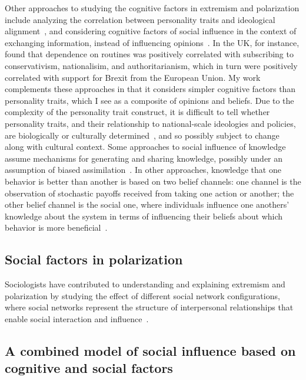 \documentclass[12pt,letterpaper]{article}
\begin{document}
Other approaches to studying the cognitive factors in extremism and polarization
include analyzing the correlation between personality traits and ideological
alignment~\cite{Rollwage2019}, and considering cognitive factors of social influence 
in the context of exchanging information, instead of influencing opinions~\cite{Carley1990,Carley1991,Bala1998}.
In the UK, for instance,  found that dependence on routines was
positively correlated with subscribing to conservativism, nationalisim, and
authoritarianism, which in turn were positively correlated with support for
Brexit from the European Union. My work complements these approaches in that
it considers simpler cognitive factors than personality traits, which I see
as a composite of opinions and beliefs. Due to the complexity of the
personality trait construct, it is difficult to tell whether personality traits,
and their relationship to national-scale ideologies and policies,
are biologically or culturally determined~\cite{Claidiere2012c,Smaldino2019d},
and so possibly subject to change along with cultural context.
Some approaches to social influence of knowledge assume mechanisms for generating and
sharing knowledge, possibly under an assumption of biased 
assimilation~\cite{Mark1998,Mark1998a,Mark2003}. In other approaches, 
knowledge that one behavior is better than another is based on two
belief channels: one channel is the observation of stochastic payoffs 
received from taking one action or another; the other belief channel is 
the social one, where individuals influence one anothers' knowledge about
the system in terms of influencing their beliefs about which behavior is
more beneficial~\cite{Zollman2007,OConnor2019e}.




\subsection{Social factors in polarization}

Sociologists have contributed to understanding and explaining extremism and
polarization by studying the effect of different social network configurations,
where social networks represent the structure of interpersonal relationships 
that enable social interaction and influence~\cite{Milgram1967,Watts1998,Watts1999,Barabasi1999,BarabasiBook}.

\subsection{A combined model of social influence based on cognitive and social factors}
\end{document}
